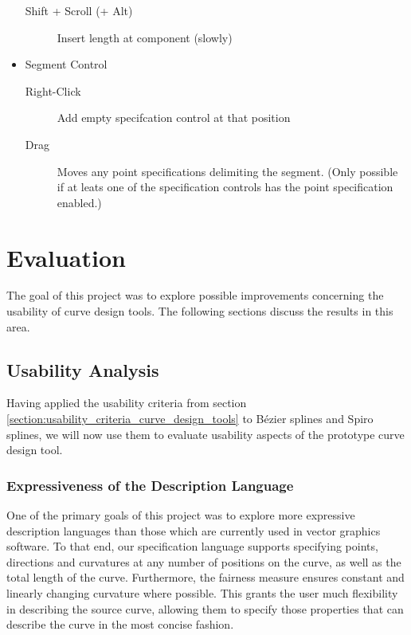 \documentclass[a4paper]{article}
\begin{document}
\begin{itemize}
\begin{description}
							\item[Shift + Scroll (+ Alt)] Insert length at component (slowly)
						\end{description}
						\item Segment Control
						\begin{description}
							\item[Right-Click] Add empty specifcation control at that position
							\item[Drag] Moves any point specifications delimiting the segment. (Only possible if at leats one of the specification controls has the point specification enabled.)
						\end{description}
					\end{itemize}
		
	\section{Evaluation}
	\label{section:evaluation}

		The goal of this project was to explore possible improvements concerning the usability of curve design tools. The following sections discuss the results in this area.

		\subsection{Usability Analysis}
		\label{section:usability_analysis}

			Having applied the usability criteria from section \ref{section:usability_criteria_curve_design_tools} to Bézier splines and Spiro splines, we will now use them to evaluate usability aspects of the prototype curve design tool.

			\subsubsection{Expressiveness of the Description Language}
			\label{section:expressiveness_description_language}

				One of the primary goals of this project was to explore more expressive description languages than those which are currently used in vector graphics software. To that end, our specification language supports specifying points, directions and curvatures at any number of positions on the curve, as well as the total length of the curve. Furthermore, the fairness measure ensures constant and linearly changing curvature where possible. This grants the user much flexibility in describing the source curve, allowing them to specify those properties that can describe the curve in the most concise fashion.
\end{document}
